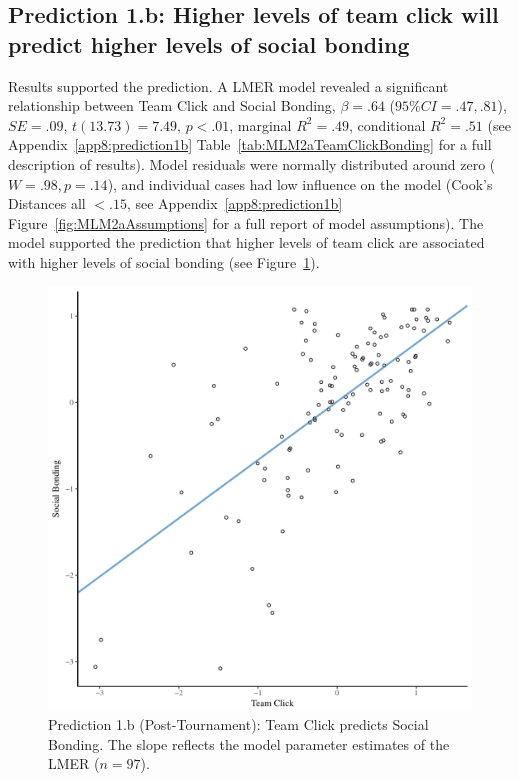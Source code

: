 \begin{CJK}{UTF8}{gbsn}









\subsection{Prediction 1.b: Higher levels of team click will predict higher levels of social bonding}

 Results supported the prediction.  A LMER model revealed a significant relationship between Team Click and Social Bonding, $\beta = .64$ ($95\% CI =  .47, .81$), $SE = .09$, $t(13.73) = 7.49$, $p < .01$, marginal $R^2 = .49$, conditional $R^2 = .51$ (see Appendix~\ref{app8:prediction1b} Table~\ref{tab:MLM2aTeamClickBonding} for a full description of results).  Model residuals were normally distributed around zero ($W = .98, p = .14$), and individual cases had low influence on the model (Cook's Distances all $< .15$, see Appendix~\ref{app8:prediction1b} Figure~\ref{fig:MLM2aAssumptions} for a full report of model assumptions).
 The model supported the prediction that higher levels of team click are associated with higher levels of social bonding (see Figure~\ref{fig:clickBondModelSlope}).

  \begin{figure}[htbp]
    \centering
  \includegraphics[scale=.5]{images/clickBondModelSlope.pdf}
    \caption{Prediction 1.b (Post-Tournament): Team Click predicts Social Bonding. The slope reflects the model parameter estimates of the LMER ($n = 97$).}
    \label{fig:clickBondModelSlope}
  \end{figure}




\end{CJK}
